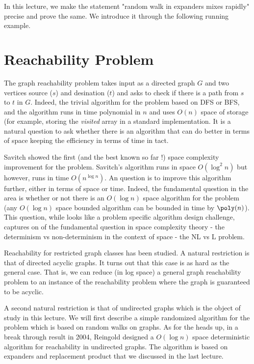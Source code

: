 
In this lecture, we make the statement "random walk in expanders mixes rapidly" precise and prove the same. We introduce it through the following running example.

\section{Reachability Problem}

The graph reachability problem takes input as a directed graph $G$ and two vertices source ($s$) and desination ($t$) and asks to check if there is a path from $s$ to $t$ in $G$. Indeed, the trivial algorithm for the problem based on DFS or BFS, and the algorithm runs in time polynomial in $n$ and uses $O(n)$ space of storage (for example, storing the {\em visited} array in a standard implementation. It is a natural question to ask whether there is an algorithm that can do better in terms of space keeping the efficiency in terms of time in tact.

Savitch\cite{Sav73} showed the first (and the best known so far !) space complexity improvement for the problem. Savitch's algorithm runs in space $O(\log^2 n)$ but however, runs in time $O(n^{\log n})$. An question is to improve this algorithm further, either in terms of space or time. Indeed, the fundamental question in the area is whether or not there is an $O(\log n)$ space algorithm for the problem (any $O(\log n)$ space bounded algorithm can be bounded in time by $\poly(n)$). This question, while looks like a problem specific algorithm design challenge, captures on of the fundamental question in space complexity theory - the determinism vs non-determinism in the context of space - the {\sf NL} vs {\sf L} problem.

Reachability for restricted graph classes has been studied. A natural restriction is that of directed acyclic graphs. It turns out that this case is as hard as the general case. That is, we can reduce (in log space) a general graph reachability problem to an instance of the reachability problem where the graph is guaranteed to be acyclic. 

A second natural restriction is that of undirected graphs which is the object of study in this lecture. We will first describe a simple randomized algorithm for the problem which is based on random walks on graphs. 
As for the heads up, in a break through result in 2004, Reingold\cite{Rei04} designed a $O(\log n)$ space deterministic algorithm for reachability in undirected graphs. The algorithm is based on expanders and replacement product that we discussed in the last lecture.

